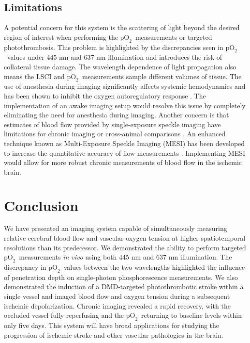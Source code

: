 \documentclass[12pt]{spieman}  %
\newcommand{\pO}{\ensuremath{\text{pO}_2}} 	            %
\begin{document}
\begin{spacing}{2}
\subsection{Limitations}
A potential concern for this system is the scattering of light beyond the desired region of interest when performing the \pO\ measurements or targeted photothrombosis. This problem is highlighted by the discrepancies seen in \pO\ values under 445 nm and 637 nm illumination and introduces the risk of collateral tissue damage. The wavelength dependence of light propagation also means the LSCI and \pO\ measurements sample different volumes of tissue. The use of anesthesia during imaging significantly affects systemic hemodynamics \cite{Janssen:2004ih} and has been shown to inhibit the oxygen autoregulatory response \cite{Aksenov:2012wh}. The implementation of an awake imaging setup \cite{Dombeck:2007gr} would resolve this issue by completely eliminating the need for anesthesia during imaging. Another concern is that estimates of blood flow provided by single-exposure speckle imaging have limitations for chronic imaging or cross-animal comparisons \cite{Kazmi:2013hp}. An enhanced technique known as Multi-Exposure Speckle Imaging (MESI) has been developed to increase the quantitative accuracy of flow measurements \cite{Parthasarathy:2008el}. Implementing MESI would allow for more robust chronic measurements of blood flow in the ischemic brain.


\section{Conclusion}
\label{sect:conclusion}
We have presented an imaging system capable of simultaneously measuring relative cerebral blood flow and vascular oxygen tension at higher spatiotemporal resolutions than its predecessor. We demonstrated the ability to perform targeted \pO\ measurements \textit{in vivo} using both 445 nm and 637 nm illumination. The discrepancy in \pO\ values between the two wavelengths highlighted the influence of penetration depth on single-photon phosphorescence measurements. We also demonstrated the induction of a DMD-targeted photothrombotic stroke within a single vessel and imaged blood flow and oxygen tension during a subsequent ischemic depolarization. Chronic imaging revealed a rapid recovery, with the occluded vessel fully reperfusing and the \pO\ returning to baseline levels within only five days. This system will have broad applications for studying the progression of ischemic stroke and other vascular pathologies in the brain.



\end{spacing}
\end{document}
